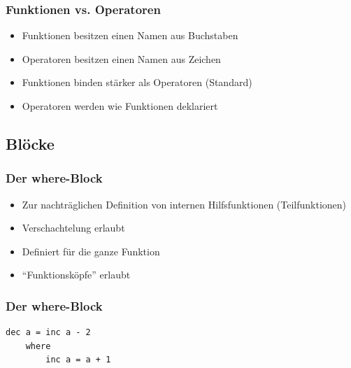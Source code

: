 \documentclass[fleqn,11pt,aspectratio=43]{beamer}
\begin{document}
\begin{frame}
\frametitle{Funktionen vs. Operatoren}
\begin{block}{\vspace*{-2ex}}
\begin{itemize}
  \item Funktionen besitzen einen Namen aus Buchstaben
  \item Operatoren besitzen einen Namen aus Zeichen
  \item Funktionen binden stärker als Operatoren (Standard)
  \item Operatoren werden wie Funktionen deklariert
\end{itemize}
\end{block}
\end{frame}

\subsection{Blöcke}
\begin{frame}
\frametitle{Der where-Block}
\vspace*{-2ex}
\begin{block}{\vspace*{-2ex}}
\begin{itemize}
  \item Zur nachträglichen Definition von internen Hilfsfunktionen (Teilfunktionen)
  \item Verschachtelung erlaubt
  \item Definiert für die ganze Funktion
  \item "`Funktionsköpfe"' erlaubt
\end{itemize}
\end{block}
\end{frame}

\begin{frame}[fragile]
\frametitle{Der where-Block}
\begin{lstlisting}
dec a = inc a - 2
    where	
        inc a = a + 1
\end{lstlisting}
\begin{exampleblock}{\vspace*{-2ex}}
\begin{center}
\vspace*{-1ex}
\scalebox{0.45}{}
\end{center}
\end{exampleblock}
\end{frame}
\end{document}
